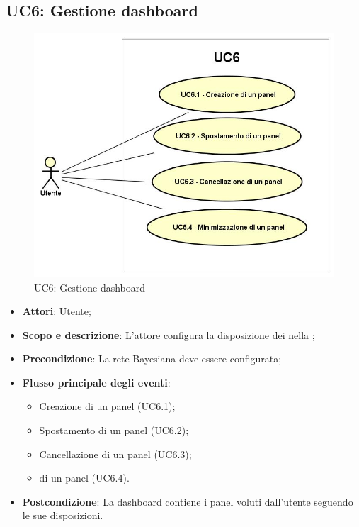 \subsection{UC6: Gestione dashboard}
\hypertarget{UC6}{}
\begin{figure} [H]
	\centering
	\includegraphics[scale=0.45]{Img/UC6}
	\caption{UC6: Gestione dashboard}\label{}
\end{figure}
\begin{itemize}
	\item \textbf{Attori}: Utente;
	\item \textbf{Scopo e descrizione}: L'attore configura la disposizione dei  nella ;
	\item \textbf{Precondizione}: La rete Bayesiana deve essere configurata;
	\item \textbf{Flusso principale degli eventi}:
	\begin{itemize}
		\item Creazione di un panel  (UC6.1);
		\item Spostamento di un panel  (UC6.2);
		\item Cancellazione di un panel  (UC6.3);
		\item {} di un panel  (UC6.4).
	\end{itemize}
	\item \textbf{Postcondizione}: La dashboard contiene i panel voluti dall'utente seguendo le sue disposizioni.
\end{itemize}
